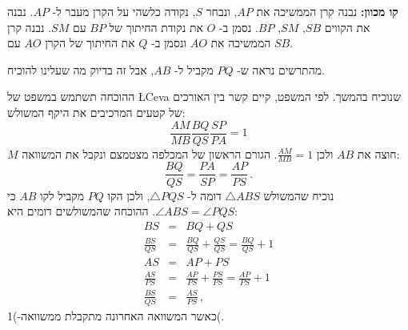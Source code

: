 \documentclass[12pt,a4paper]{article}
\newcommand*{\disfrac}[2]{\displaystyle\frac{#1}{#2}}
\begin{document}
\textbf{%
קו מכוון:
}
נבנה קרן הממשיכה את
$AP$,
ונבחר
$S$,
נקודה כלשהי על הקרן מעבר ל-%
$AP$.
נבנה את הקווים
$SB$, $SM$, $BP$.
נסמן ב-%
$O$
את נקודת החיתוך של 
$BP$
עם
$SM$.
נבנה קרן הממשיכה את
$AO$
ונסמן ב-%
$Q$
את החיתוך של הקרן
$AO$
עם
$SB$.
\begin{center}
\vspace*{-4pt}
\vspace*{-4pt}
\end{center}
מהתרשים נראה ש-%
$PQ$
מקביל ל-%
$AB$,
אבל זה בדיוק מה שעלינו להוכיח.

ההוכחה תשתמש במשפט של
\L{Ceva}
שנוכיח בהמשך. לפי המשפט, קיים קשר בין האורכים של קטעים המרכיבים את היקף המשולש:
\[
\frac{AM}{MB}\frac{BQ}{QS}\frac{SP}{PA} = 1
\]
$M$
חוצה את
$AB$
ולכן
$\frac{AM}{MB}=1$.
הגורם הראשון של המכלפה מצטמצם ונקבל את המשוואה:
\begin{equation}
\frac{BQ}{QS}=\frac{PA}{SP}=\frac{AP}{PS}\,.
\end{equation}
נוכיח שהמשולש
$\triangle ABS$
דומה ל-%
$\triangle PQS$,
ולכן הקו
$PQ$
מקביל לקו
$AB$
כי
$\angle ABS = \angle PQS$.
ההוכחה שהמשולשים דומים היא:
\vspace*{-10pt}
\[
\renewcommand*{\arraystretch}{2}
\begin{array}{rcl}
BS&=&BQ+QS\\
\disfrac{BS}{QS}&=&\disfrac{BQ}{QS}+\disfrac{QS}{QS} = \disfrac{BQ}{QS}+1\\
AS&=&AP+PS\\
\disfrac{AS}{PS} &=& \disfrac{AP}{PS} + \disfrac{PS}{PS} = \disfrac{AP}{PS} + 1\\
\disfrac{BS}{QS}&=&\disfrac{AS}{PS}\,,
\end{array}
\]
כאשר המשוואה האחרונה מתקבלת ממשוואה-)1(.
\end{document}
